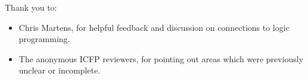 \documentclass{sigplanconf}
\begin{document}




















\acks

Thank you to:
\begin{itemize}
\item Chris Martens, for helpful feedback and discussion on connections to logic
  programming.
\item The anonymous ICFP reviewers, for pointing out areas which were previously
  unclear or incomplete.
\end{itemize}





\end{document}
